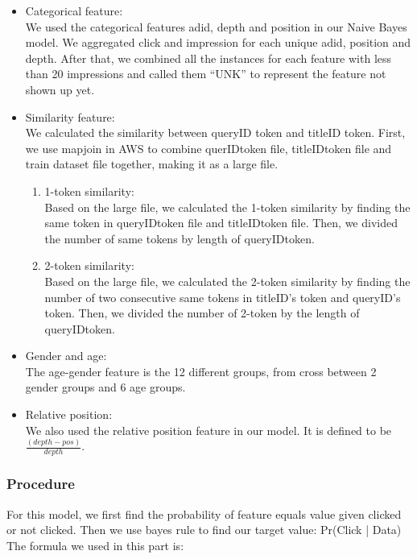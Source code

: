 \documentclass[12pt]{article}
\begin{document}
\begin{itemize}
  \item Categorical feature: \\
We used the categorical features adid, depth and position in our Naive Bayes  model. We aggregated click and impression for each unique adid, position and depth. After that, we combined all the instances for each feature with less than 20 impressions and called them “UNK” to represent the feature not shown up yet.

  \item Similarity feature:\\
We calculated the similarity between queryID token and titleID token. First, we use mapjoin in AWS  to combine querIDtoken file, titleIDtoken file and train dataset file together, making it as a large file.
\begin{enumerate}
  \item 1-token similarity:\\
Based on the large file, we calculated the 1-token similarity by finding the same token in queryIDtoken file and titleIDtoken file. Then, we divided the number of same tokens by length of queryIDtoken.
  \item 2-token similarity:\\
Based on the large file, we calculated the 2-token similarity by finding the number of two consecutive same tokens in titleID’s token and queryID’s token. Then, we divided the number of 2-token by the length of queryIDtoken.
\end{enumerate}
  \item Gender and age:\\
The age-gender feature is the 12 different groups, from cross between 2 gender groups and 6 age groups.
  \item Relative position:\\
We also used the relative position feature in our model. It is defined to be $\frac{(depth - pos)} { depth}$.
\end{itemize}


\subsubsection{Procedure}
For this model, we first find the probability of feature equals value given clicked or not clicked. Then we use bayes rule to find our target value: Pr(Click | Data) 
The formula we used in this part is:\\
\end{document}
